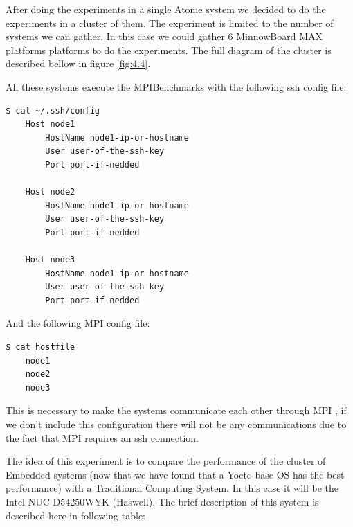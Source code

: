 After doing the experiments in a single Atome system we decided to do the
experiments in a cluster of them. The experiment is limited to the number of
systems we can gather. In this case we could gather 6  MinnowBoard MAX
platforms \cite{minnowboard} platforms to do the experiments. The full diagram
of the cluster is described bellow in figure \ref{fig:4.4}.


All these systems execute the MPIBenchmarks with the following ssh config file:

\begin{minipage}{\textwidth}
\end{minipage}

\begin{minipage}{\textwidth}

\begin{lstlisting}[frame=single]
  $ cat ~/.ssh/config
    Host node1
        HostName node1-ip-or-hostname
        User user-of-the-ssh-key
        Port port-if-nedded

    Host node2
        HostName node1-ip-or-hostname
        User user-of-the-ssh-key
        Port port-if-nedded

    Host node3
        HostName node1-ip-or-hostname
        User user-of-the-ssh-key
        Port port-if-nedded

\end{lstlisting}

\end{minipage}

And the following MPI config file:


\begin{minipage}{\textwidth}
\end{minipage}

\begin{minipage}{\textwidth}
\begin{lstlisting}[frame=single]
  $ cat hostfile
    node1
    node2
    node3
\end{lstlisting}

\end{minipage}

This is necessary to make the systems communicate each other through MPI , if we
don't include this configuration there will not be any communications due to the
fact that MPI requires an ssh connection. 

The idea of this experiment is to compare the performance of the cluster of
Embedded systems (now that we have found that a Yocto base OS has the best
performance) with a Traditional Computing System. In this case it will be the
Intel NUC D54250WYK (Haswell). The brief description of this system is
described here in following table: 

